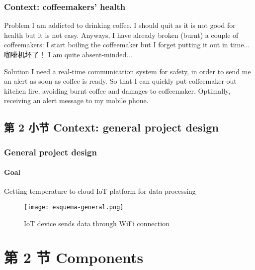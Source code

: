 \documentclass[
    aspectratio=169,                   %
]{beamer}
\begin{document}
    \begin{frame}
        \frametitle{Context: coffeemakers' health}

        \begin{block}{Problem}
            I am addicted to drinking coffee. I should quit as it is not good for health but it is not easy. Anyways, I have already broken (burnt) a couple of coffeemakers: I start boiling the coffeemaker but I forget putting it out in time... 咖啡机坏了！ I am quite absent-minded...
        \end{block}

        \begin{block}{Solution}
            I need a real-time communication system for safety, in order to send me an alert as soon as coffee is ready. So that I can quickly put coffeemaker out kitchen fire, avoiding burnt coffee and damages to coffeemaker. Optimally, receiving an alert message to my mobile phone.
        \end{block}

    \end{frame}

\subsection{第 2 小节 Context: general project design}

    \begin{frame}
        \frametitle{General project design}

        \paragraph{Goal} Getting temperature to cloud IoT platform for data processing

        \begin{figure}
            \centering
            \begin{stampbox}
                \texttt{[image: esquema-general.png]}
            \end{stampbox}
            \caption{IoT device sends data through WiFi connection}
        \end{figure}

    \end{frame}

\section{第 2 节 Components}
\end{document}
